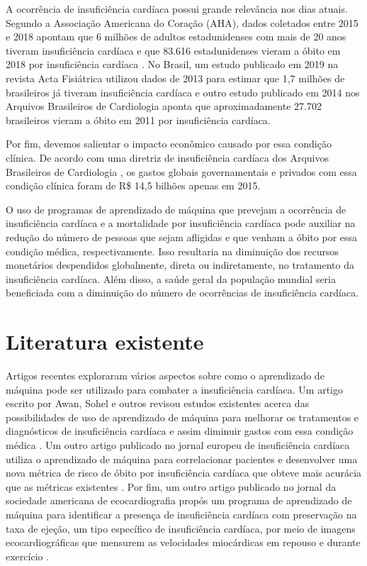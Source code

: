 A ocorrência de insuficiência cardíaca possui grande relevância nos dias atuais. Segundo a Associação Americana do Coração (AHA), dados coletados entre 2015 e 2018 apontam que 6 milhões de adultos estadunidenses com mais de 20 anos tiveram insuficiência cardíaca \cite[p.8]{heart_disease2021} e que 83.616 estadunidenses vieram a óbito em 2018 por insuficiência cardíaca \cite[p.485]{heart_disease2021}. No Brasil, um estudo publicado em 2019 na revista Acta Fisiátrica \cite{nogueira2019} utilizou dados de 2013 para estimar que 1,7 milhões de brasileiros já tiveram insuficiência cardíaca e outro estudo publicado em 2014 nos Arquivos Brasileiros de Cardiologia \cite{gaui2014} aponta que aproximadamente 27.702 brasileiros vieram a óbito em 2011 por insuficiência cardíaca.

Por fim, devemos salientar o impacto econômico causado por essa condição clínica. De acordo com uma diretriz de insuficiência cardíaca dos Arquivos Brasileiros de Cardiologia \cite{diretriz_insuficiencia_cardiaca_2018}, os gastos globais governamentais e privados com essa condição clínica foram de R\$ 14,5 bilhões apenas em 2015.

O uso de programas de aprendizado de máquina que prevejam a ocorrência de insuficiência cardíaca e a mortalidade por insuficiência cardíaca pode auxiliar na redução do número de pessoas que sejam afligidas e que venham a óbito por essa condição médica, respectivamente. Isso resultaria na diminuição dos recursos monetários despendidos globalmente, direta ou indiretamente, no tratamento da insuficiência cardíaca. Além disso, a saúde geral da população mundial seria beneficiada com a diminuição do número de ocorrências de insuficiência cardíaca.

\section{Literatura existente}

Artigos recentes exploraram vários aspectos sobre como o aprendizado de máquina pode ser utilizado para combater a insuficiência cardíaca. Um artigo escrito por Awan, Sohel e outros revisou estudos existentes acerca das possibilidades de uso de aprendizado de máquina para melhorar os tratamentos e diagnósticos de insuficiência cardíaca e assim diminuir gastos com essa condição médica \cite{awan2018}. Um outro artigo publicado no jornal europeu de insuficiência cardíaca utiliza o aprendizado de máquina para correlacionar pacientes e desenvolver uma nova métrica de risco de óbito por insuficiência cardíaca que obteve mais acurácia que as métricas existentes \cite{adler2020}. Por fim, um outro artigo publicado no jornal da sociedade americana de ecocardiografia propós um programa de aprendizado de máquina para identificar a presença de insuficiência cardíaca com preservação na taxa de ejeção, um tipo específico de insuficiência cardíaca, por meio de imagens ecocardiográficas que mensurem as velocidades miocárdicas em repouso e durante exercício \cite{hfpef2018}.

